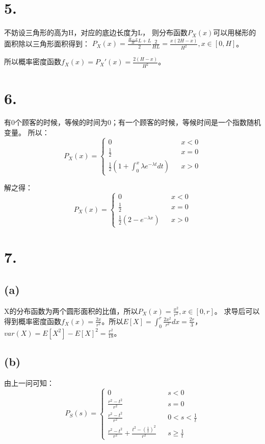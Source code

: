 \documentclass[UTF8]{report}
\begin{document}
    \section*{5.}
        不妨设三角形的高为H，对应的底边长度为L，
        则分布函数$P_X(x)$可以用梯形的面积除以三角形面积得到：
        $P_X(x) = \frac{\frac{H - x}{H}L + L}{2}\frac{2}{HL} = \frac{x(2H - x)}{H^2}, x \in [0, H]$。

        所以概率密度函数$f_X(x) = P_X'(x) = \frac{2(H - x)}{H^2}$。
    \section*{6.}
        有0个顾客的时候，等候的时间为0；有一个顾客的时候，等候时间是一个指数随机变量。
        所以：
        $$P_X(x) = \left\{
            \begin{array}{lcr}
                0 & & x < 0\\
                \frac{1}{2} & & x = 0\\
                \frac{1}{2}(1 + \int_{0}^{x}\lambda e^{-\lambda t}dt) & & x > 0
            \end{array}
        \right.$$

        解之得：
        $$P_X(x) = \left\{
            \begin{array}{lcr}
                0 & & x < 0\\
                \frac{1}{2} & & x = 0\\
                \frac{1}{2}(2 - e^{-\lambda x}) & & x > 0
            \end{array}
        \right.$$
    \section*{7.}
        \subsection*{(a)}
            X的分布函数为两个圆形面积的比值，所以$P_X(x) = \frac{x^2}{r^2}, x \in [0, r]$。
            求导后可以得到概率密度函数$f_X(x) = \frac{2x}{r^2}$。所以$E[X] = \int_{0}^{r}\frac{2x^2}{r^2}dx = \frac{2r}{3}$，
            $var(X) = E[X^2] - E[X]^2 = \frac{r^2}{18}$。
        \subsection*{(b)}
            由上一问可知：
            $$P_S(s) = \left\{
                \begin{array}{lcr}
                    0 & & s < 0\\
                    \frac{r^2 - t^2}{r^2} & & s = 0\\
                    \frac{r^2 - t^2}{r^2} & & 0 < s < \frac{1}{t}\\
                    \frac{r^2 - t^2}{r^2} + \frac{t^2 - (\frac{1}{s})^2}{r^2} & & s \geq \frac{1}{t}
                \end{array}
            \right.$$
\end{document}
